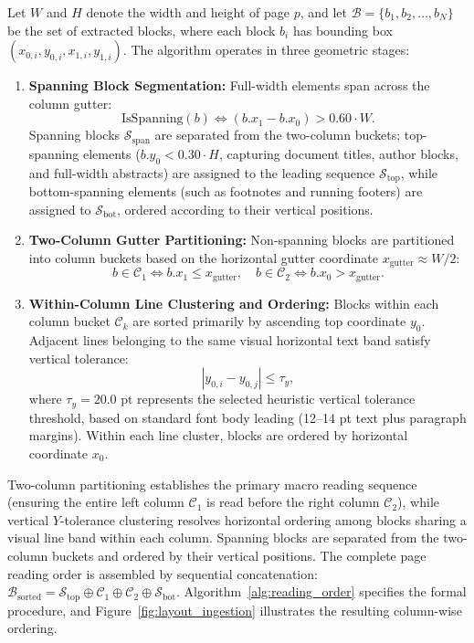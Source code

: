 \documentclass[12pt,a4paper]{report}
\begin{document}
Let $W$ and $H$ denote the width and height of page $p$, and let $\mathcal{B} = \{b_1, b_2, \dots, b_N\}$ be the set of extracted blocks, where each block $b_i$ has bounding box $(x_{0,i}, y_{0,i}, x_{1,i}, y_{1,i})$. The algorithm operates in three geometric stages:
\begin{enumerate}
    \item \textbf{Spanning Block Segmentation:} Full-width elements span across the column gutter:
    \begin{equation}
    \text{IsSpanning}(b) \iff (b.x_1 - b.x_0) > 0.60 \cdot W.
    \end{equation}
    Spanning blocks $\mathcal{S}_{\text{span}}$ are separated from the two-column buckets; top-spanning elements ($b.y_0 < 0.30 \cdot H$, capturing document titles, author blocks, and full-width abstracts) are assigned to the leading sequence $\mathcal{S}_{\text{top}}$, while bottom-spanning elements (such as footnotes and running footers) are assigned to $\mathcal{S}_{\text{bot}}$, ordered according to their vertical positions.
    \item \textbf{Two-Column Gutter Partitioning:} Non-spanning blocks are partitioned into column buckets based on the horizontal gutter coordinate $x_{\text{gutter}} \approx W / 2$:
    \begin{equation}
    b \in \mathcal{C}_1 \iff b.x_1 \le x_{\text{gutter}}, \quad b \in \mathcal{C}_2 \iff b.x_0 > x_{\text{gutter}}.
    \end{equation}
    \item \textbf{Within-Column Line Clustering and Ordering:} Blocks within each column bucket $\mathcal{C}_k$ are sorted primarily by ascending top coordinate $y_0$. Adjacent lines belonging to the same visual horizontal text band satisfy vertical tolerance:
    \begin{equation}
    |y_{0,i} - y_{0,j}| \le \tau_y,
    \end{equation}
    where $\tau_y = 20.0\text{ pt}$ represents the selected heuristic vertical tolerance threshold, based on standard font body leading (12--14 pt text plus paragraph margins). Within each line cluster, blocks are ordered by horizontal coordinate $x_0$.
\end{enumerate}
Two-column partitioning establishes the primary macro reading sequence (ensuring the entire left column $\mathcal{C}_1$ is read before the right column $\mathcal{C}_2$), while vertical $Y$-tolerance clustering resolves horizontal ordering among blocks sharing a visual line band within each column. Spanning blocks are separated from the two-column buckets and ordered by their vertical positions. The complete page reading order is assembled by sequential concatenation: $\mathcal{B}_{\text{sorted}} = \mathcal{S}_{\text{top}} \oplus \mathcal{C}_1 \oplus \mathcal{C}_2 \oplus \mathcal{S}_{\text{bot}}$. Algorithm~\ref{alg:reading_order} specifies the formal procedure, and Figure~\ref{fig:layout_ingestion} illustrates the resulting column-wise ordering.
\end{document}
